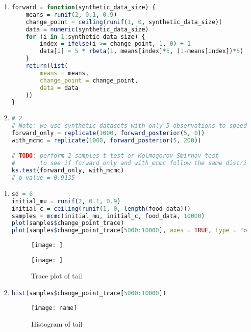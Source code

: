 \documentclass{article}
\begin{document}
\begin{enumerate}
\item 
\begin{lstlisting}[language=R]
forward = function(synthetic_data_size) {
    means = runif(2, 0.1, 0.9)
    change_point = ceiling(runif(1, 0, synthetic_data_size))
    data = numeric(synthetic_data_size)
    for (i in 1:synthetic_data_size) {
        index = ifelse(i >= change_point, 1, 0) + 1
        data[i] = 5 * rbeta(1, means[index]*5, (1-means[index])*5)
    } 
    return(list(
        means = means,
        change_point = change_point,
        data = data
    ))
}
\end{lstlisting}


\item 
\begin{lstlisting}[language=R]
# 2
# Note: we use synthetic datasets with only 5 observations to speed things up
forward_only = replicate(1000, forward_posterior(5, 0))
with_mcmc = replicate(1000, forward_posterior(5, 200))

# TODO: perform 2-samples t-test or Kolmogorov-Smirnov test
#       to see if forward_only and with_mcmc follow the same distribution. 
ks.test(forward_only, with_mcmc)
# p-value = 0.9135
\end{lstlisting}
\end{enumerate}

\begin{enumerate}
\item 
\begin{lstlisting}[language=R]
sd = 6
initial_mu = runif(2, 0.1, 0.9)
initial_c = ceiling(runif(1, 0, length(food_data)))
samples = mcmc(initial_mu, initial_c, food_data, 10000)
plot(samples$change_point_trace)
plot(samples$change_point_trace[5000:10000], axes = TRUE, type = "o", col = rgb(red = 0, green = 0, blue = 0, alpha = 0.2))  
\end{lstlisting}
\begin{figure}
    \begin{minipage}{0.5\textwidth}
        \centering
        \texttt{[image: ]}
        \caption{Trace plot of all}
        \label{fig:trace_all}
    \end{minipage}
    \begin{minipage}{0.5\textwidth}
        \centering
        \texttt{[image: ]}
        \caption{Trace plot of tail}
        \label{fig:trace_tail}
    \end{minipage}
\end{figure}

\item 
\begin{lstlisting}[language=R]
hist(samples$change_point_trace[5000:10000]) 
\end{lstlisting}
\begin{figure}
\centering
\texttt{[image: name]}
\caption{Histogram of tail}
\label{fig:hist}
\end{figure}


\end{enumerate}
 
\end{document}

